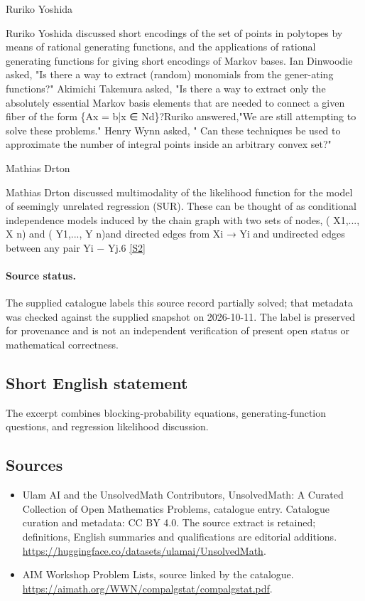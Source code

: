 \documentclass[11pt]{article}
\newcommand{\sref}[2]{\hyperlink{source:#1:#2}{[S#2]}}
\begin{document}
Ruriko Yoshida

Ruriko Yoshida discussed short encodings of the set of points in polytopes by means of rational generating functions, and the applications of rational generating functions for giving short encodings of Markov bases. Ian Dinwoodie asked, "Is there a way to extract (random) monomials from the gener-ating functions?" Akimichi Takemura asked, "Is there a way to extract only the absolutely essential Markov basis elements that are needed to connect a given fiber of the form \{Ax = b|x ∈ Nd\}?Ruriko answered,"We are still attempting to solve these problems." Henry Wynn asked, " Can these techniques be used to approximate the number of integral points inside an arbitrary convex set?"

Mathias Drton

Mathias Drton discussed multimodality of the likelihood function for the model of seemingly unrelated regression (SUR). These can be thought of as conditional independence models induced by the chain graph with two sets of nodes, ( X1,..., X n) and ( Y1,..., Y n)and directed edges from Xi → Yi and undirected edges between any pair Yi − Yj.6 \sref{statement}{2}
\paragraph{Source status.}
The supplied catalogue labels this source record partially solved; that metadata was checked against the supplied snapshot on 2026-10-11. The label is preserved for provenance and is not an independent verification of present open status or mathematical correctness.
\subsection{Short English statement}
The excerpt combines blocking-probability equations, generating-function questions, and regression likelihood discussion.
\subsection{Sources}
\begin{itemize}
\item[\hypertarget{source:statement:1}{S1}] Ulam AI and the UnsolvedMath Contributors, UnsolvedMath: A Curated Collection of Open Mathematics Problems, catalogue entry. Catalogue curation and metadata: CC BY 4.0. The source extract is retained; definitions, English summaries and qualifications are editorial additions.
\url{https://huggingface.co/datasets/ulamai/UnsolvedMath}.
\item[\hypertarget{source:statement:2}{S2}] AIM Workshop Problem Lists, source linked by the catalogue.
\url{https://aimath.org/WWN/compalgstat/compalgstat.pdf}.
\end{itemize}
\end{document}
